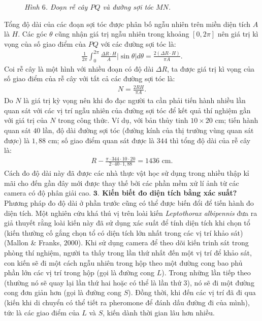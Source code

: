 \begin{multicols}{2}
\begin{figure}[H]
		\caption{\small\textit{\color{toanhocdoisong}Hình $6$. Đoạn rễ cây $PQ$ và đường sợi tóc $MN$.}}
		\vspace*{-10pt}
	\end{figure}
	Tổng độ dài của các đoạn sợi tóc được phân bố ngẫu nhiên trên miền diện tích $A$ là $H$. Các góc $\theta$ cũng nhận giá trị ngẫu nhiên trong khoảng $[0,2\pi]$ nên giá trị kì vọng của số giao điểm của $PQ$ với các đường sợi tóc là:
	\begin{align*}
		\frac{1}{2\pi}\int_0^{2\pi}{\frac{{\Delta R \cdot H}}{A}}|\sin\theta|d\theta= \frac{2\left(\Delta R \cdot H\right)}{\pi A}.
	\end{align*}
	Coi rễ cây là một hình với nhiều đoạn có độ dài $\Delta R$, ta được giá trị kì vọng của số giao điểm của rễ cây với tất cả các đường sợi tóc là:
	\begin{align*}
		N = \frac{2RH}{\pi A}.
	\end{align*}
	Do $N$ là giá trị kỳ vọng nên khi đo đạc người ta cần phải tiến hành nhiều lần quan sát với các vị trí ngẫu nhiên của đường sợi tóc để kết quả thí nghiệm gần với giá trị của $N$ trong công thức.
	\vskip 0.1cm
	Ví dụ, với bản thủy tinh $10\times 20$ cm; tiến hành quan sát $40$ lần, độ dài đường sợi tóc (đường kính của thị trường vùng quan sát được) là $1{,}88$ cm; số giao điểm quan sát được là $344$ thì tổng độ dài của rễ cây là:
	\begin{align*}
		R - \frac{\pi \cdot 344\cdot 10 \cdot 20}{2\cdot40 \cdot1{,}88} = 1436 \text{ cm}.
	\end{align*}
	Cách đo độ dài này đã được các nhà thực vật học sử dụng trong nhiều thập kỉ mãi cho đến gần đây mới được thay thế bởi các phần mềm xử lí ảnh từ các camera có độ phân giải cao.
	\vskip 0.1cm
	\textbf{\color{toanhocdoisong}$\pmb{3.}$ Kiến biết đo diện tích bằng xác suất?}
	\vskip 0.1cm
	Phương pháp đo độ dài ở phần trước cũng có thể được biến đổi để tiến hành đo diện tích.
	\vskip 0.1cm
	Một nghiên cứu khá thú vị trên loài kiến \textit{Leptothorax albipennis} đưa ra giả thuyết rằng loài kiến này đã sử dụng xác suất để tính diện tích khi chọn tổ (kiến thường cố gắng chọn tổ có diện tích lớn nhất trong các vị trí khảo sát) (Mallon \& Franks, $2000$).
	\vskip 0.1cm
	Khi sử dụng camera để theo dõi kiến trinh sát trong phòng thí nghiệm, người ta thấy trong lần thứ nhất đến một vị trí để khảo sát, con kiến sẽ đi một cách ngẫu nhiên trong hộp theo một đường cong bao phủ phần lớn các vị trí trong hộp (gọi là đường cong $L$). Trong những lần tiếp theo (thường nó sẽ quay lại lần thứ hai hoặc có thể là lần thứ $3$), nó sẽ đi một đường cong đơn giản hơn (gọi là đường cong $S$). Đồng thời, khi đến các vị trí đã đi qua (kiến khi di chuyển có thể tiết ra pheromone để đánh dấu đường đi của mình), tức là các giao điểm của $L$ và $S$, kiến dành thời gian lâu hơn nhiều.

\end{multicols}
